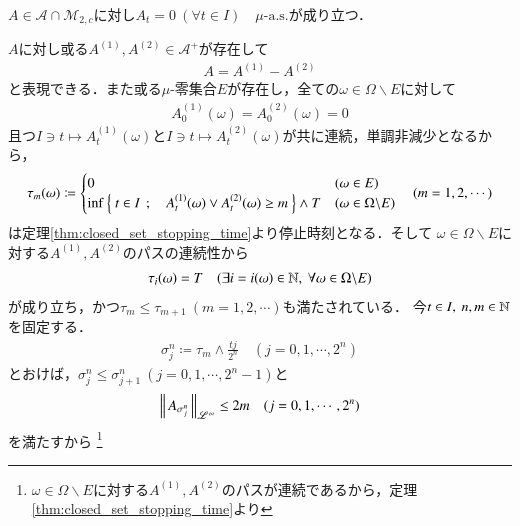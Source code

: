 	\begin{screen}
		\begin{prp}[有界変動な連続二乗可積分マルチンゲールのパスは定数]\mbox{}\\
			$A \in \mathcal{A} \cap \mathcal{M}_{2,c}$に対し$A_t = 0\ (\forall t \in I)\quad \mbox{$\mu$-a.s.}$が成り立つ．
			\label{prp:bounded_continuous_M_2c_path}
		\end{prp}
	\end{screen}
	
	\begin{prf}
		$A$に対し或る$A^{(1)},A^{(2)} \in \mathcal{A}^+$が存在して
		\begin{align}
			A = A^{(1)} - A^{(2)}
		\end{align}
		と表現できる．また或る$\mu$-零集合$E$が存在し，全ての$\omega \in \Omega \backslash E$に対して
		\begin{align}
			A_0^{(1)}(\omega) = A_0^{(2)}(\omega) = 0
		\end{align}
		且つ$I \ni t \longmapsto A_t^{(1)}(\omega)$と$I \ni t \longmapsto A_t^{(2)}(\omega)$が共に連続，単調非減少となるから，
		\begin{align}
			\tau_m(\omega) \coloneqq
			\begin{cases}
				0 & (\omega \in E) \\
				\operatorname*{inf}_{} \left\{\ t \in I\ \, ; \quad A_t^{(1)}(\omega) \vee A_t^{(2)}(\omega) \geq m\ \right\} \wedge T & (\omega \in \Omega \backslash E)
			\end{cases}
			\quad (m=1,2,\cdots)
		\end{align}
		は定理\ref{thm:closed_set_stopping_time}より停止時刻となる．そして
		$\omega \in \Omega \backslash E$に対する$A^{(1)},A^{(2)}$のパスの連続性から
		\begin{align}
			\tau_i(\omega) = T \quad (\exists i = i(\omega) \in \N,\ \forall \omega \in \Omega \backslash E)
		\end{align}
		が成り立ち，かつ$\tau_m \leq \tau_{m+1}\ (m=1,2,\cdots)$も満たされている．
		今$t \in I,\ n,m \in \mathbb{N}$を固定する．
		\begin{align}
			\sigma_j^n \coloneqq \tau_m \wedge \frac{tj}{2^n} \quad (j = 0,1,\cdots, 2^n)
		\end{align}
		とおけば，$\sigma_j^n \leq \sigma_{j+1}^n\ (j = 0,1,\cdots, 2^n-1)$と
		\begin{align}
			\left\|\, A_{\sigma_j^n}\, \right\|_{\mathscr{L}^\infty} \leq 2m \quad (j = 0,1,\cdots, 2^n)
		\end{align}
		を満たすから
		\footnote{
			$\omega \in \Omega \backslash E$に対する$A^{(1)},A^{(2)}$のパスが連続であるから，定理\ref{thm:closed_set_stopping_time}より
}
\end{prf}
